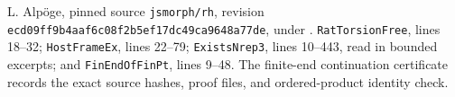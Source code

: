 L. Alp\"oge, pinned source \texttt{jsmorph/rh}, revision
\texttt{ecd09ff9b4aaf6c08f2b5ef17dc49ca9648a77de}, under
.
\texttt{RatTorsionFree}, lines 18--32;
\texttt{HostFrameEx}, lines 22--79;
\texttt{ExistsNrep3}, lines 10--443, read in bounded excerpts;
and \texttt{FinEndOfFinPt}, lines 9--48.
The finite-end continuation certificate records the exact source
hashes, proof files, and ordered-product identity check.
